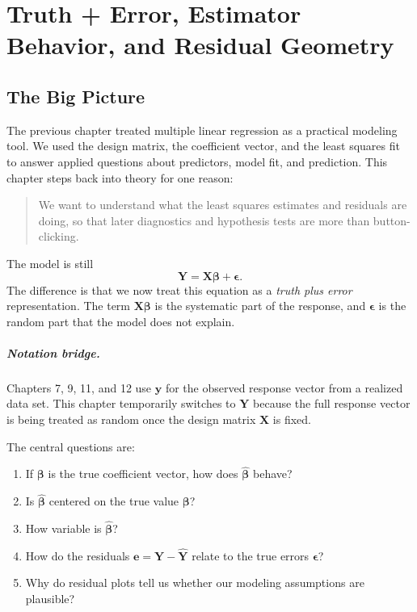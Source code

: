 \chapter{Truth + Error, Estimator Behavior, and Residual Geometry}
\label{chap:truth-error-estimator-behavior-residual-geometry}

\section{The Big Picture}

The previous chapter treated multiple linear regression as a practical modeling tool.  We used the design matrix, the coefficient vector, and the least squares fit to answer applied questions about predictors, model fit, and prediction.  This chapter steps back into theory for one reason:
\begin{quote}
  We want to understand what the least squares estimates and residuals are doing, so that later diagnostics and hypothesis tests are more than button-clicking.
\end{quote}

The model is still
\begin{equation}
  \mathbf{Y}=\mathbf{X}\boldsymbol{\beta}+\boldsymbol{\epsilon}.
\end{equation}
The difference is that we now treat this equation as a \emph{truth plus error} representation.  The term \(\mathbf{X}\boldsymbol{\beta}\) is the systematic part of the response, and \(\boldsymbol{\epsilon}\) is the random part that the model does not explain.

\paragraph{Notation bridge.}
Chapters 7, 9, 11, and 12 use \(\mathbf{y}\) for the observed response vector from a realized data set.  This chapter temporarily switches to \(\mathbf{Y}\) because the full response vector is being treated as random once the design matrix \(\mathbf{X}\) is fixed.

The central questions are:
\begin{enumerate}
  \item If \(\boldsymbol{\beta}\) is the true coefficient vector, how does \(\widehat{\boldsymbol{\beta}}\) behave?
  \item Is \(\widehat{\boldsymbol{\beta}}\) centered on the true value \(\boldsymbol{\beta}\)?
  \item How variable is \(\widehat{\boldsymbol{\beta}}\)?
  \item How do the residuals \(\mathbf{e}=\mathbf{Y}-\widehat{\mathbf{Y}}\) relate to the true errors \(\boldsymbol{\epsilon}\)?
  \item Why do residual plots tell us whether our modeling assumptions are plausible?
\end{enumerate}

